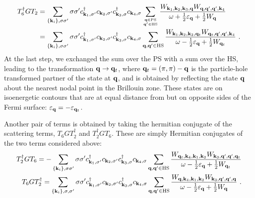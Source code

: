 \documentclass{revtex4-2}
\begin{document}
\begin{equation}\begin{aligned}\label{t2t62}
	T_6^\dagger G T_2 &= \sum_{\left\{{\bf k}_i\right\}, \sigma\sigma^\prime}\sigma\sigma^\prime c^\dagger_{{\bf k}_1,\sigma^\prime}c_{{\bf k}_2,\sigma^\prime} c^\dagger_{{\bf k}_3,\sigma} c_{{\bf k}_4,\sigma}\sum_{{\bf q}\in\text{PS}\atop{{\bf q}^\prime \in \text{HS}}}\frac{W_{{\bf k}_1,{\bf k}_2,{\bf k}_3,{\bf q}} W_{{\bf q},{{\bf q}^\prime},{{\bf q}^\prime},{\bf k}_4}}{\omega + \frac{1}{2}\varepsilon_{{\bf q}} + \frac{1}{2}W_{{\bf q}}} \\
						  &= \sum_{\left\{{\bf k}_i\right\}, \sigma\sigma^\prime}\sigma\sigma^\prime c^\dagger_{{\bf k}_1,\sigma^\prime}c_{{\bf k}_2,\sigma^\prime} c^\dagger_{{\bf k}_3,\sigma} c_{{\bf k}_4,\sigma}\sum_{{\bf q},{\bf q}^\prime\in\text{HS}}\frac{W_{{\bf k}_1,{\bf k}_2,{\bf k}_3,{\bf q}_t} W_{{\bf q}_t,{{\bf q}^\prime},{{\bf q}^\prime},{\bf k}_4}}{\omega - \frac{1}{2}\varepsilon_{{\bf q}} + \frac{1}{2}W_{{\bf q}_t}}~.
\end{aligned}\end{equation}
At the last step, we exchanged the sum over the PS with a sum over the HS, leading to the transformation \({\bf q} \to {\bf q}_t\), where \({\bf q}_t = \left( \pi, \pi \right) - {\bf q}\) is the particle-hole transformed partner of the state at \({\bf q}\), and is obtained by reflecting the state \({\bf q}\) about the nearest nodal point in the Brillouin zone. These states are on isoenergetic contours that are at equal distance from but on opposite sides of the Fermi surface: \(\varepsilon_{{\bf q}} = -\varepsilon_{{\bf q}_t}\). 

Another pair of terms is obtained by taking the hermitian conjugate of the scattering terms, \(T_6 G T_2^\dagger\) and \(T_2^\dagger G T_6\). These are simply Hermitian conjugates of the two terms considered above:
\begin{equation}\begin{aligned}
		T_2^\dagger G T_6 = -\sum_{\left\{{\bf k}_i\right\}, \sigma\sigma^\prime}\sigma\sigma^\prime c^\dagger_{{\bf k}_1,\sigma^\prime}c_{{\bf k}_2,\sigma^\prime} c^\dagger_{{\bf k}_3,\sigma} c_{{\bf k}_4,\sigma}\sum_{{\bf q},{\bf q}^\prime\in\text{HS}}\frac{W_{{\bf q}_t,{\bf k}_4,{\bf k}_1,{\bf k}_2} W_{{\bf k}_3,{{\bf q}^\prime},{{\bf q}^\prime},{\bf q}_t}}{\omega - \frac{1}{2}\varepsilon_{{\bf q}} + \frac{1}{2}W_{{\bf q}_t}}\\
		T_6 G T_2^\dagger = \sum_{\left\{{\bf k}_i\right\}, \sigma, \sigma^\prime} \sigma\sigma^\prime c^\dagger_{{\bf k}_1,\sigma^\prime}c_{{\bf k}_2,\sigma^\prime} c^\dagger_{{\bf k}_3,\sigma} c_{{\bf k}_4,\sigma}\sum_{{\bf q}, {\bf q}^\prime\in\text{HS}}\frac{W_{{\bf q},{\bf k}_4,{\bf k}_1,{\bf k}_2} W_{{\bf k}_3,{{\bf q}^\prime},{{\bf q}^\prime},{\bf q}}}{\omega - \frac{1}{2}\varepsilon_{{\bf q}} + \frac{1}{2}W_{{\bf q}}}~.
\end{aligned}\end{equation}
\end{document}

